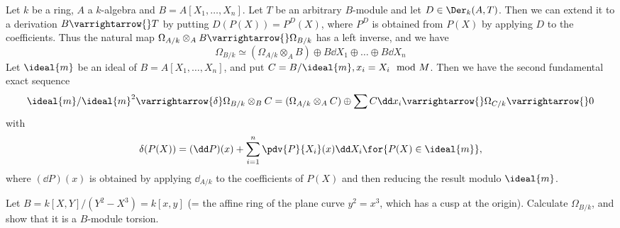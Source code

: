 \documentclass[../main]{subfiles}
\begin{document}
\begin{parexample}
    Let $k$ be a ring, $A$ a $k$-algebra and \newline $B=A[X_1,\dots, X_n]$. Let $T$ be an arbitrary $B$-module and let $D \in \Der_k(A, T)$. Then we can extend it to a derivation $B \varrightarrow{} T$ by putting $D(P(X))=P^D(X)$, where $P^D$ is obtained from $P(X)$ by applying $D$ to the coefficients. Thus the natural map \newline $\Omega_{A / k} \otimes_A B \varrightarrow{} \Omega_{B / k}$ has a left inverse, and we have \[\Omega_{B / k} \simeq(\Omega_{A / k} \otimes_A B) \oplus B\dd X_1 \oplus \dots \oplus B \dd X_n\] Let $\ideal{m}$ be an ideal of $B=A[X_1, \dots, X_n]$, and put $C=B / \ideal{m}, x_i=X_i \mod M$. Then we have the second fundamental exact sequence \[ \ideal{m}/ \ideal{m}^2 \varrightarrow{\delta} \Omega_{B / k} \otimes_B C=(\Omega_{A/k} \otimes_A C) \oplus \sum C\dd x_i \varrightarrow{} \Omega_{C / k} \varrightarrow{} 0\] with \[\delta(P(X))=(\dd P)(x)+\sum_{i=1}^n \pdv{P}{X_i}(x) \dd X_i \for{P(X) \in \ideal{m}},\] where $(\dd P)(x)$ is obtained by applying $\dd_{A / k}$ to the coefficients of $P(X)$ and then reducing the result modulo $\ideal{m}$.
\end{parexample}

\begin{exercise}\label{exe:26.04}
    Let $B=k[X, Y] /(Y^2-X^3)=k[x, y]$ (= the affine ring of the plane curve $y^2=x^3$, which has a cusp at the origin). Calculate $\Omega_{B/k}$, and show that it is a $B$-module torsion.
\end{exercise}
\end{document}
